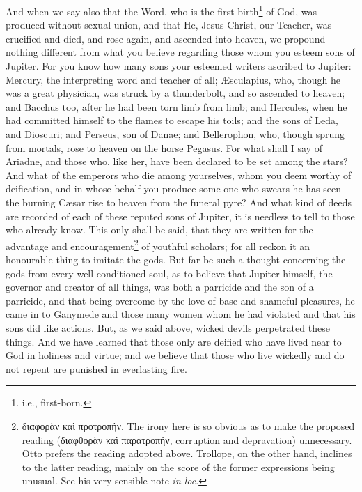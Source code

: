 And when we say also that the Word, who is the first-birth\footnote{i.e., first-born.} of God, was produced without sexual union, and that He, Jesus Christ, our Teacher, was crucified and died, and rose again, and ascended into heaven, we propound nothing different from what you believe regarding those whom you esteem sons of Jupiter. For you know how many sons your esteemed writers ascribed to Jupiter: Mercury, the interpreting word and teacher of all; Æsculapius, who, though he was a great physician, was struck by a thunderbolt, and so ascended to heaven; and Bacchus too, after he had been torn limb from limb; and Hercules, when he had committed himself to the flames to escape his toils; and the sons of Leda, and Dioscuri; and Perseus, son of Danae; and Bellerophon, who, though sprung from mortals, rose to heaven on the horse Pegasus. For what shall I say of Ariadne, and those who, like her, have been declared to be set among the stars? And what of the emperors who die among yourselves, whom you deem worthy of deification, and in whose behalf you produce some one who swears he has seen the burning Cæsar rise to heaven from the funeral pyre? And what kind of deeds are recorded of each of these reputed sons of Jupiter, it is needless to tell to those who already know. This only shall be said, that they are written for the advantage and encouragement\footnote{\textgreek{διαφορὰν καὶ προτροπήν}. The irony here is so obvious as to make the proposed reading (\textgreek{διαφθορὰν καὶ παρατροπήν}, corruption and depravation) unnecessary. Otto prefers the reading adopted above. Trollope, on the other hand, inclines to the latter reading, mainly on the score of the former expressions being unusual. See his very sensible note \emph{in loc}.} of youthful scholars; for all reckon it an honourable thing to imitate the gods. But far be such a thought concerning the gods from every well-conditioned soul, as to believe that Jupiter himself, the governor and creator of all things, was both a parricide and the son of a parricide, and that being overcome by the love of base and shameful pleasures, he came in to Ganymede and those many women whom he had violated and that his sons did like actions. But, as we said above, wicked devils perpetrated these things. And we have learned that those only are deified who have lived near to God in holiness and virtue; and we believe that those who live wickedly and do not repent are punished in everlasting fire.


